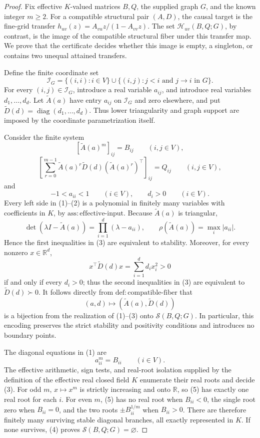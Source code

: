 \documentclass{article}
\begin{document}
\begin{proof}
Fix effective \(K\)-valued matrices \(B,Q\), the supplied graph \(G\), and the known integer \(m\geq2\).  For a compatible structural pair \((A,D)\), the causal target is the fine-grid transfer \(h_{uv}(z)=A_{vu}z/(1-A_{vv}z)\).  The set \(\mathcal H_{uv}(B,Q;G)\), by contrast, is the image of the compatible structural fiber under this transfer map.  We prove that the certificate decides whether this image is empty, a singleton, or contains two unequal attained transfers.

Define the finite coordinate set
\[
 \mathcal I_G
 =\{(i,i):i\in V\}\cup
   \{(i,j):j<i\text{ and }j\to i\text{ in }G\}.
\]
For every \((i,j)\in\mathcal I_G\), introduce a real variable \(a_{ij}\), and introduce real variables \(d_1,\ldots,d_d\).  Let \(\widetilde A(a)\) have entry \(a_{ij}\) on \(\mathcal I_G\) and zero elsewhere, and put \(\widetilde D(d)=\operatorname{diag}(d_1,\ldots,d_d)\).  Thus lower triangularity and graph support are imposed by the coordinate parametrization itself.

Consider the finite system
\[
 [\widetilde A(a)^m]_{ij}=B_{ij}\qquad(i,j\in V),                 \tag{1}
\]
\[
 \left[\sum_{r=0}^{m-1}\widetilde A(a)^r\widetilde D(d)
                    (\widetilde A(a)^r)^\top\right]_{ij}
 =Q_{ij}\qquad(i,j\in V),                                        \tag{2}
\]
and
\[
 -1<a_{ii}<1\qquad(i\in V),
 \qquad d_i>0\qquad(i\in V).                                    \tag{3}
\]
Every left side in (1)--(2) is a polynomial in finitely many variables with coefficients in \(K\), by \(\mathrm{ass{:}effective\mbox{-}input}\).  Because \(\widetilde A(a)\) is triangular,
\[
 \det(\lambda I-\widetilde A(a))=\prod_{i=1}^d(\lambda-a_{ii}),
 \qquad \rho(\widetilde A(a))=\max_i|a_{ii}|.
\]
Hence the first inequalities in (3) are equivalent to stability.  Moreover, for every nonzero \(x\in\mathbb R^d\),
\[
 x^\top\widetilde D(d)x=\sum_{i=1}^d d_i x_i^2>0
\]
if and only if every \(d_i>0\); thus the second inequalities in (3) are equivalent to \(\widetilde D(d)\succ0\).  It follows directly from \(\mathrm{def{:}compatible\mbox{-}fiber}\) that
\[
 (a,d)\longmapsto (\widetilde A(a),\widetilde D(d))               \tag{4}
\]
is a bijection from the realization of (1)--(3) onto \(\mathcal S(B,Q;G)\).  In particular, this encoding preserves the strict stability and positivity conditions and introduces no boundary points.

The diagonal equations in (1) are
\[
 a_{ii}^{m}=B_{ii}\qquad(i\in V).                                \tag{5}
\]
The effective arithmetic, sign tests, and real-root isolation supplied by the definition of the effective real closed field \(K\) enumerate their real roots and decide (3).  For odd \(m\), \(x\mapsto x^m\) is strictly increasing and onto \(\mathbb R\), so (5) has exactly one real root for each \(i\).  For even \(m\), (5) has no real root when \(B_{ii}<0\), the single root zero when \(B_{ii}=0\), and the two roots \(\pm B_{ii}^{1/m}\) when \(B_{ii}>0\).  There are therefore finitely many surviving stable diagonal branches, all exactly represented in \(K\).  If none survives, (4) proves \(\mathcal S(B,Q;G)=\varnothing\).


\end{proof}
\end{document}
